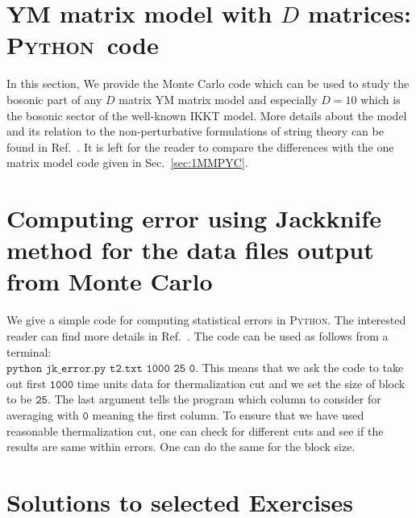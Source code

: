 \documentclass[letter,11pt]{article}
\newcommand{\PY}{\textsc{Python}}
\begin{document}
\section{\label{sec:YMC}YM matrix model with $D$ matrices: \PY~code}

In this section, We provide the Monte Carlo code which can be used to study the bosonic part of any $D$ matrix YM matrix model and especially $D=10$ which is the bosonic sector of the well-known IKKT model. More details about the model and its relation to the non-perturbative formulations of string theory can be found in Ref.~\cite{Hotta:1998en}.
It is left for the reader to compare the differences with the one matrix model code given in Sec.~\ref{sec:1MMPYC}. 
	\begin{mdframed}[backgroundcolor=mauve!3] 
			
	\end{mdframed} 


\section{Computing error using Jackknife method for the data files output from Monte Carlo}
We give a simple code for computing statistical errors in \PY. The interested reader can find more details in Ref.~\cite{2012arXiv1210.3781Y}. The code can be used as follows from a terminal: \\ 
$\texttt{python jk\_error.py t2.txt 1000 25 0}$. This means that we ask the code to take out first $\texttt{1000}$ time units data for thermalization cut and we set the size of block to be $\texttt{25}$. The last argument tells the program which column to consider for averaging with $\texttt{0}$ meaning the first column. To ensure that we have used reasonable thermalization cut, one can check for different cuts and see if the results 
are same within errors. One can do the same for the block size. 
	\begin{mdframed}[backgroundcolor=mauve!3] 
			
	\end{mdframed} 

\section{\label{sec:solutions}Solutions to selected Exercises} 
\end{document}
